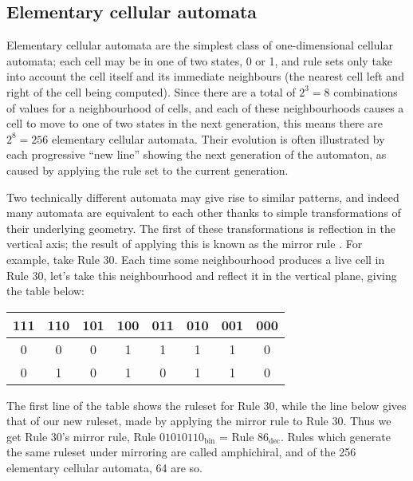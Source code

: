 \documentclass[11pt,a4paper]{article}
\begin{document}
    \subsection{Elementary cellular automata}
    Elementary cellular automata are the simplest class of one-dimensional
    cellular automata; each cell may be in one of two states, 0 or 1, and rule
    sets only take into account the cell itself and its immediate neighbours
    (the nearest cell left and right of the cell being computed). Since there
    are a total of $2^3=8$ combinations of values for a neighbourhood of cells,
    and each of these neighbourhoods causes a cell to move to one of two states
    in the next generation, this means there are $2^8=256$ elementary cellular
    automata. Their evolution is often illustrated by each progressive ``new
    line'' showing the next generation of the automaton, as caused by applying
    the rule set to the current generation.
    
    Two technically different automata may give rise to similar patterns, and
    indeed many automata are equivalent to each other thanks to simple
    transformations of their underlying geometry. The first of these
    transformations is reflection in the vertical axis; the result of applying
    this is known as the mirror rule \cite{elementary}. For example, take Rule
    30. Each time some neighbourhood produces a live cell in Rule 30, let's take
    this neighbourhood and reflect it in the vertical plane, giving the table
    below:

    \begin{table}[h]
        \centering
        \begin{tabular}{|c|c|c|c|c|c|c|c|}\hline
            111 & 110 & 101 & 100 & 011 & 010 & 001 & 000   \\
            \hline
            0 & 0 & 0 & 1 & 1 & 1 & 1 & 0   \\
            \hline
            0 & 1 & 0 & 1 & 0 & 1 & 1 & 0   \\
            \hline
        \end{tabular}
    \end{table}

    The first line of the table shows the ruleset for Rule 30, while the line
    below gives that of our new ruleset, made by applying the mirror rule to
    Rule 30. Thus we get Rule 30's mirror rule, Rule $01010110_{\text{bin}}$ =
    Rule $86_{\text{dec}}$. Rules which generate the same ruleset under
    mirroring are called amphichiral, and of the 256 elementary cellular
    automata, 64 are so.
\end{document}
